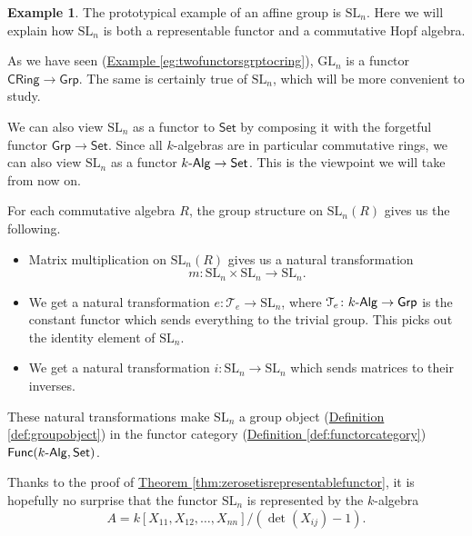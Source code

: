 \documentclass[a4paper,10pt]{scrreprt}
\newcommand{\SL}{\mathrm{SL}}
\newcommand{\GL}{\mathrm{GL}}
\def\mhyp{{\hbox{-}}}
\theoremstyle{definition}
\newtheorem{example}{Example}[section]
\theoremstyle{plain}
\theoremstyle{remark}
\begin{document}
\begin{example}
  \label{eg:slnisahopfalgebra}
  The prototypical example of an affine group is $\SL_{n}$. Here we will explain how $\SL_{n}$ is both a representable functor and a commutative Hopf algebra.

  As we have seen (\hyperref[eg:twofunctorsgrptocring]{Example \ref*{eg:twofunctorsgrptocring}}), $\GL_{n}$ is a functor $\mathsf{CRing} \to \mathsf{Grp}$. The same is certainly true of $\SL_{n}$, which will be more convenient to study. 

  We can also view $\SL_{n}$ as a functor to $\mathsf{Set}$ by composing it with the forgetful functor $\mathsf{Grp} \to \mathsf{Set}$. Since all $k$-algebras are in particular commutative rings, we can also view $\SL_{n}$ as a functor $k\mhyp\mathsf{Alg} \to \mathsf{Set}$. This is the viewpoint we will take from now on. 

  For each commutative algebra $R$, the group structure on $\SL_{n}(R)$ gives us the following.
  \begin{itemize}
    \item Matrix multiplication on $\SL_{n}(R)$ gives us a natural transformation
      \begin{equation*}
        m\colon \SL_{n} \times \SL_{n} \to \SL_{n}.
      \end{equation*} 

    \item We get a natural transformation $e\colon \mathcal{T}_{e} \to \SL_{n}$, where $\mathcal{T}_{e}\colon k\mhyp\mathsf{Alg} \to \mathsf{Grp}$ is the constant functor which sends everything to the trivial group. This picks out the identity element of $\SL_{n}$.

    \item We get a natural transformation $i\colon \SL_{n} \to \SL_{n}$ which sends matrices to their inverses.
  \end{itemize}

  These natural transformations make $\SL_{n}$ a group object (\hyperref[def:groupobject]{Definition \ref*{def:groupobject}}) in the functor category (\hyperref[def:functorcategory]{Definition \ref*{def:functorcategory}}) $\mathsf{Func}(k\mhyp\mathsf{Alg}, \mathsf{Set})$.

  Thanks to the proof of \hyperref[thm:zerosetisrepresentablefunctor]{Theorem \ref*{thm:zerosetisrepresentablefunctor}}, it is hopefully no surprise that the functor $\SL_{n}$ is represented by the $k$-algebra 
  \begin{equation*}
    A = k[X_{11}, X_{12}, \ldots, X_{nn}]/(\det(X_{ij}) - 1).
  \end{equation*}


\end{example}
\end{document}
